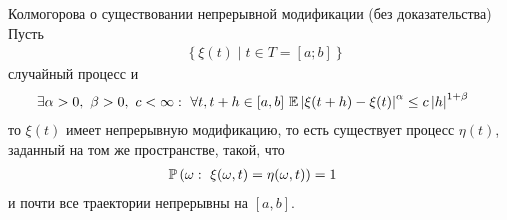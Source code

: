\begin{theorem} Колмогорова о существовании непрерывной модификации (без доказательства)
    \\
    Пусть
    \begin{align*}
      & \left\{ \xi(t) \mid t \in T = [a;b] \right\}
    \end{align*}
    случайный процесс и
    \begin{align*}
      & \exists \alpha > 0, \ \beta > 0, \ c < \infty: \ \forall t, t+h \in [a, b] \ \EE\left| \xi(t+h)-\xi(t) \right|^{\alpha} \leq c \left| h \right|^{1+\beta}
    \end{align*}
    то $\xi(t)$ имеет непрерывную модификацию, то есть существует процесс
    $\eta(t)$, заданный на том же пространстве, такой, что
    \begin{align*}
      & \mathbb{P}\left( \omega: \ \xi(\omega, t) = \eta(\omega, t) \right) = 1
    \end{align*}
    и почти все траектории непрерывны на $[a,b]$.
\end{theorem}
